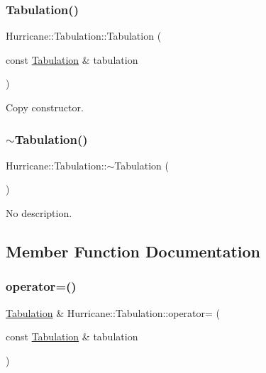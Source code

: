 \subsubsection{\texorpdfstring{Tabulation()}{Tabulation()}\hspace{0.1cm}{\footnotesize\ttfamily [2/2]}}
{\footnotesize\ttfamily Hurricane\+::\+Tabulation\+::\+Tabulation (\begin{DoxyParamCaption}\item[{const \hyperlink{classHurricane_1_1Tabulation}{Tabulation} \&}]{tabulation }\end{DoxyParamCaption})}

Copy constructor. \mbox{\label{classHurricane_1_1Tabulation_aa549d938b7534f8eae8e8e954b1f3207}} 
\subsubsection{\texorpdfstring{$\sim$\+Tabulation()}{~Tabulation()}}
{\footnotesize\ttfamily Hurricane\+::\+Tabulation\+::$\sim$\+Tabulation (\begin{DoxyParamCaption}{ }\end{DoxyParamCaption})}

No description. 

\subsection{Member Function Documentation}
\mbox{\label{classHurricane_1_1Tabulation_a33c4a5152580309407e3e2730f07c321}} 
\subsubsection{\texorpdfstring{operator=()}{operator=()}}
{\footnotesize\ttfamily \hyperlink{classHurricane_1_1Tabulation}{Tabulation} \& Hurricane\+::\+Tabulation\+::operator= (\begin{DoxyParamCaption}\item[{const \hyperlink{classHurricane_1_1Tabulation}{Tabulation} \&}]{tabulation }\end{DoxyParamCaption})}

